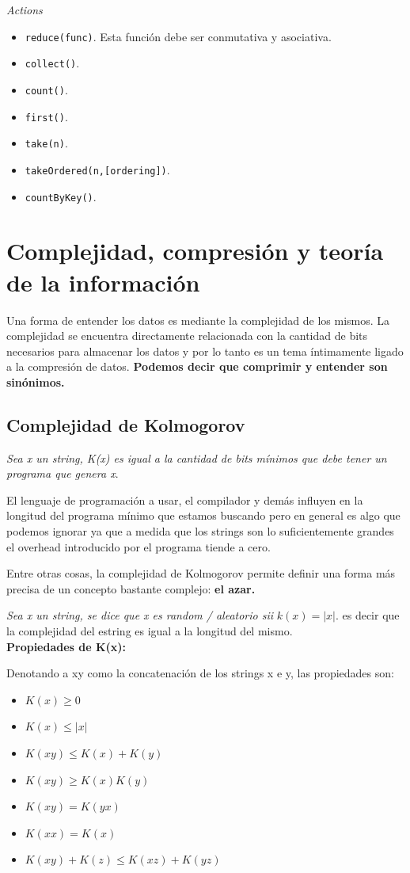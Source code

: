 \documentclass[titlepage,a4paper]{article}
\begin{document}
\textit{Actions}
\begin{itemize}
\item \texttt{reduce(func)}. Esta función debe ser conmutativa y asociativa. 
\item \texttt{collect()}.
\item \texttt{count()}.
\item \texttt{first()}.
\item \texttt{take(n)}.
\item \texttt{takeOrdered(n,[ordering])}.
\item \texttt{countByKey()}.
\end{itemize}

\section*{Complejidad, compresión y teoría de la información}
Una forma de entender los datos es mediante la complejidad de los mismos. La complejidad se encuentra directamente relacionada con la cantidad de bits necesarios para almacenar los datos y por lo tanto es un tema íntimamente ligado a la compresión de datos. \textbf{Podemos decir que comprimir y entender son sinónimos.} 
\subsection*{Complejidad de Kolmogorov}
\textit{Sea x un string, K(x) es igual a la cantidad de bits mínimos que debe tener un programa que genera x}. 

El lenguaje de programación a usar, el compilador y demás influyen en la longitud del programa mínimo que estamos buscando pero en general es algo que podemos ignorar ya que a medida que los strings son lo suficientemente grandes el overhead introducido por el programa tiende a cero. 

Entre otras cosas, la complejidad de Kolmogorov permite definir una forma más precisa de un concepto bastante complejo:\textbf{ el azar. }

\textit{Sea x un string, se dice que x es random / aleatorio sii} $k(x) = |x|$. es decir que la complejidad del estring es igual a la longitud del mismo. \\

\textbf{Propiedades de K(x):}

Denotando a xy como la concatenación de los strings x e y, las propiedades son:
\begin{itemize}
\item  $K(x) \geq 0$
\item $K(x) \leq |x|$
\item $K(xy) \leq K(x) + K(y)$
\item $K(xy) \geq K(x)K(y)$
\item $K(xy) = K(yx)$
\item $K(xx) = K(x)$
\item $K(xy)+K(z) \leq K(xz) + K(yz)$ 
\end{itemize}
\end{document}
